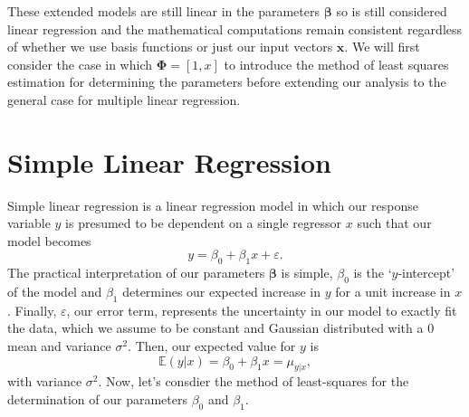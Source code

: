 \documentclass[10pt,a4paper]{article}
\numberwithin{equation}{section}
\theoremstyle{plain}
\theoremstyle{definition}
\theoremstyle{own}
\begin{document}
These extended models are still linear in the parameters $\boldsymbol\beta$ so is still considered linear regression and the mathematical computations remain consistent regardless of whether we use basis functions or just our input vectors $\mathbf{x}$. We will first consider the case in which $\boldsymbol\Phi = [1, x]$ to introduce the method of least squares estimation for determining the parameters before extending our analysis to the general case for multiple linear regression.
\section{Simple Linear Regression}
Simple linear regression is a linear regression model in which our response variable $y$ is presumed to be dependent on a single regressor $x$ such that our model becomes
\begin{equation}
y = \beta_0 + \beta_1 x + \varepsilon.
\end{equation}
The practical interpretation of our parameters $\boldsymbol\beta$ is simple, $\beta_0$ is the `$y$-intercept' of the model and $\beta_1$ determines our expected increase in $y$ for a unit increase in $x$. Finally, $\varepsilon$, our error term, represents the uncertainty in our model to exactly fit the data, which we assume to be constant and Gaussian distributed with a 0 mean and variance $\sigma^2$. Then, our expected value for $y$ is
\begin{equation}
\mathbb{E}(y|x) = \beta_0 + \beta_1 x = \mu_{y|x},
\end{equation}
with variance $\sigma^2$. Now, let's consdier the method of least-squares for the determination of our parameters $\beta_0$ and $\beta_1$.
\end{document}
